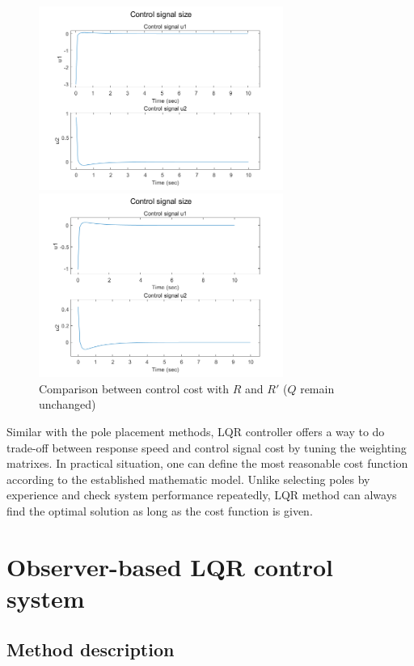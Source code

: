 \documentclass[hyperref]{article}
\theoremstyle{nonumberplain}
\begin{document}
\begin{figure}[H]
		\begin{minipage}[t]{0.48\textwidth}
			\centering
			\includegraphics[width=8cm]{fig17.png}
		\end{minipage}
		\begin{minipage}[t]{0.48\textwidth}
			\centering
			\includegraphics[width=8cm]{fig19.png}
		\end{minipage}
		\caption{Comparison between control cost with $R$ and ${R}'$ ($Q$ remain unchanged)}
		
		\label{fig14}
	\end{figure}

	Similar with the pole placement methods, LQR controller offers a way to do trade-off between response speed and control signal cost by tuning the weighting matrixes. In practical situation, one can define the most reasonable cost function according to the established mathematic model. Unlike selecting poles by experience and check system performance repeatedly, LQR method can always find the optimal solution as long as the cost function is given.
	
	\section{Observer-based LQR control system}
	
	\subsection{Method description}
	
\end{document}
